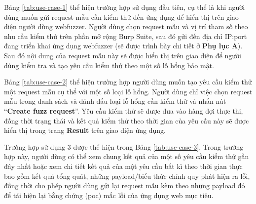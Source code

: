 Bảng \ref{tab:use-case-1} thể hiện trường hợp sử dụng đầu tiên, cụ thể là khi người dùng muốn gửi request mẫu cần kiểm thử đến ứng dụng để hiển thị trên giao diện người dùng webfuzzer. Người dùng chọn request mẫu và vị trí tham số theo nhu cầu kiểm thử trên phần mở rộng Burp Suite, sau đó gửi đến địa chỉ IP:port đang triển khai ứng dụng webfuzzer (sẽ được trình bày chi tiết ở \textbf{Phụ lục A}). Sau đó nội dung của request mẫu này sẽ được hiển thị trên giao diện để người dùng kiểm tra và tạo yêu cầu kiểm thử theo một số lỗ hổng bảo mật.\par
Bảng \ref{tab:use-case-2} thể hiện trường hợp người dùng muốn tạo yêu cầu kiểm thử một request mẫu cụ thể với một số loại lỗ hổng. Người dùng chỉ việc chọn request mẫu trong danh sách và đánh dấu loại lỗ hổng cần kiểm thử và nhấn nút ``\textbf{Create fuzz request}''. Yêu cầu kiểm thử sẽ được đưa vào hàng đợi thực thi, đồng thời trạng thái và kết quả kiểm thử theo thời gian của yêu cầu này sẽ được hiển thị trong trang \textbf{Result} trên giao diện ứng dụng.\par
Trường hợp sử dụng 3 được thể hiện trong Bảng \ref{tab:use-case-3}. Trong trường hợp này, người dùng có thể xem chung kết quả của một số yêu cầu kiểm thử gần đây nhất hoặc xem chi tiết kết quả của một yêu cầu bất kì theo thời gian thực bao gồm kết quả tổng quát, những payload/biểu thức chính quy phát hiện ra lỗi, đồng thời cho phép người dùng gửi lại request mẫu kèm theo những payload đó để tái hiện lại bằng chứng (\acrshort{poc}) mắc lỗi của ứng dụng web mục tiêu.
